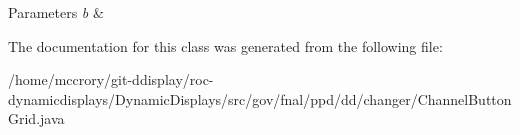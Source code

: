 \begin{DoxyParams}{Parameters}
{\em b} & \\
\hline
\end{DoxyParams}


The documentation for this class was generated from the following file\-:\begin{DoxyCompactItemize}
\item 
/home/mccrory/git-\/ddisplay/roc-\/dynamicdisplays/\-Dynamic\-Displays/src/gov/fnal/ppd/dd/changer/Channel\-Button\-Grid.\-java\end{DoxyCompactItemize}
